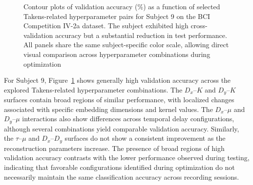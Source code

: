\begin{figure}[H]
{\begin{minipage}[c]{0.99\textwidth}
\end{minipage}%
}

\caption{{Contour plots of validation accuracy (\%) as a function of selected Takens-related hyperparameter pairs for Subject 9 on the BCI Competition IV-2a dataset. The subject exhibited high cross-validation accuracy but a substantial reduction in test performance. All panels share the same subject-specific color scale, allowing direct visual comparison across hyperparameter combinations during optimization}}
\label{fig:global_freq_ctenet 9 bci2a}
\end{figure}
For Subject 9, Figure~\ref{fig:global_freq_ctenet 9 bci2a} shows generally high validation accuracy across the explored Takens-related hyperparameter combinations. The $D_x$--$K$ and $D_y$--$K$ surfaces contain broad regions of similar performance, with localized changes associated with specific embedding dimensions and kernel values. The $D_x$--$\mu$ and $D_y$--$\mu$ interactions also show differences across temporal delay configurations, although several combinations yield comparable validation accuracy. Similarly, the $\tau$--$\mu$ and $D_x$--$D_y$ surfaces do not show a consistent improvement as the reconstruction parameters increase. The presence of broad regions of high validation accuracy contrasts with the lower performance observed during testing, indicating that favorable configurations identified during optimization do not necessarily maintain the same classification accuracy across recording sessions.

